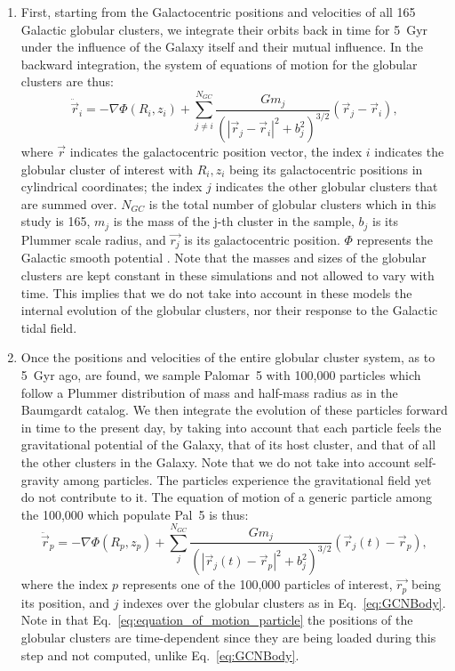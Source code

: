 \documentclass{aa}
\begin{document}
      \begin{enumerate}
        \item First, starting from the Galactocentric positions and velocities of all 165 Galactic globular clusters, we integrate their orbits back in time for 5~Gyr under the influence of the Galaxy itself and their mutual influence. In the backward integration, the system of equations of motion for the globular clusters are thus: 
        \begin{equation}
          \ddot{\vec{r}}_i = -\nabla \Phi(R_i,z_i) + \left.\sum_{j\neq i}^{N_{GC}} \frac{Gm_j}{\left(|\vec{r}_j - \vec{r}_i|^2 + b_j^2\right)^{3/2}}\right. \left(\vec{r}_j - \vec{r}_i\right),
        \end{equation}\label{eq:GCNBody} where $\vec{r}$ indicates the galactocentric position vector, the index $i$ indicates the globular cluster of interest with $R_i,z_i$ being its galactocentric positions in cylindrical coordinates; the index $j$ indicates the other globular clusters that are summed over. $N_{GC}$ is the total number of globular clusters which in this study is 165, $m_j$ is the mass of the j-th cluster in the sample, $b_j$ is its Plummer scale radius, and $\vec{r_j}$ is its galactocentric position. $\Phi$ represents the Galactic smooth potential \citep[][Model~II, in the present case]{2017A&A...598A..66P}. Note that the masses and sizes of the globular clusters are kept constant in these simulations and not allowed to vary with time. This implies that we do not take into account in these models the internal evolution of the globular clusters, nor their response to the Galactic tidal field.
      
        \item Once the positions and velocities of the entire globular cluster system, as to 5~Gyr ago, are found, we sample Palomar~5 with  100,000 particles which follow a Plummer distribution of mass and half-mass radius as in the Baumgardt catalog.  We then integrate the evolution of these particles forward in time to the present day, by taking into account that each particle feels the gravitational potential of the Galaxy, that of its host cluster, and that of all the other clusters in the Galaxy. Note that we do not take into account self-gravity among particles. The particles experience the gravitational field yet do not contribute to it. The equation of motion of a generic particle among the 100,000 which populate Pal~5 is thus: 
        \begin{equation}
          \ddot{\vec{r}}_p = -\nabla \Phi(R_p,z_p) + \left.\sum_{j}^{N_{GC}} \frac{Gm_j}{\left(|\vec{r}_j(t) - \vec{r}_p|^2 + b_j^2\right)^{3/2}}\right. \left(\vec{r}_j(t)- \vec{r}_p\right),
        \end{equation} \label{eq:equation_of_motion_particle} where the index $p$ represents one of the 100,000 particles of interest, $\vec{r_p}$ being its position, and $j$ indexes over the globular clusters as in Eq.~\ref{eq:GCNBody}. Note in that Eq.~\ref{eq:equation_of_motion_particle} the positions of the globular clusters are time-dependent since they are being loaded during this step and not computed, unlike Eq.~\ref{eq:GCNBody}. 

      \end{enumerate}
\end{document}
